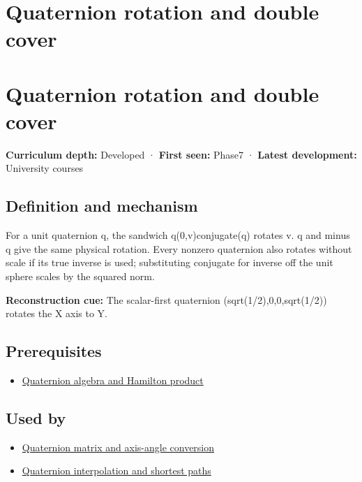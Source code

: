 \hypertarget{appendix-8e61ab68f6b2}{}
\section*{Quaternion rotation and double cover}
\section{Quaternion rotation and double cover}\label{appendix-8e61ab68f6b2-quaternion-rotation-and-double-cover}

\textbf{Curriculum depth:} Developed · \textbf{First seen:} Phase7 · \textbf{Latest development:} University courses

\subsection{Definition and mechanism}\label{appendix-8e61ab68f6b2-definition-and-mechanism}

For a unit quaternion q, the sandwich q(0,v)conjugate(q) rotates v. q and minus q give the same physical rotation. Every nonzero quaternion also rotates without scale if its true inverse is used; substituting conjugate for inverse off the unit sphere scales by the squared norm.

\textbf{Reconstruction cue:} The scalar-first quaternion (sqrt(1/2),0,0,sqrt(1/2)) rotates the X axis to Y.

\subsection{Prerequisites}\label{appendix-8e61ab68f6b2-prerequisites}

\begin{itemize}
\tightlist
\item
  \hyperref[appendix-965d9260eeab]{Quaternion algebra and Hamilton product}
\end{itemize}

\subsection{Used by}\label{appendix-8e61ab68f6b2-used-by}

\begin{itemize}
\tightlist
\item
  \hyperref[appendix-26d8da71f6c4]{Quaternion matrix and axis-angle conversion}
\item
  \hyperref[appendix-9b4b8254f26b]{Quaternion interpolation and shortest paths}
\end{itemize}

